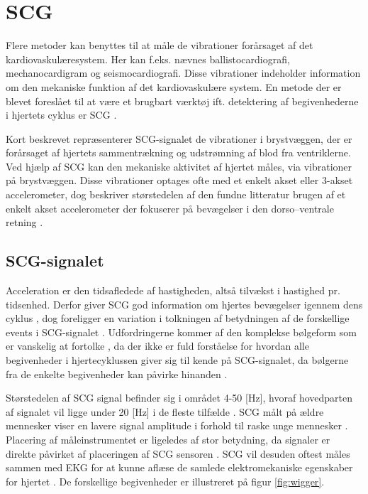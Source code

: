 \section{SCG}
Flere metoder kan benyttes til at måle de vibrationer forårsaget af det kardiovaskulæresystem. Her kan f.eks. nævnes ballistocardiografi, mechanocardigram og seismocardiografi. Disse vibrationer indeholder information om den mekaniske funktion af det kardiovaskulære system. En metode der er blevet foreslået til at være et brugbart værktøj ift. detektering af begivenhederne i hjertets cyklus er SCG \cite{phd}. 

Kort beskrevet repræsenterer SCG-signalet de vibrationer i brystvæggen, der er forårsaget af hjertets sammentrækning og udstrømning af blod fra ventriklerne. Ved hjælp af  SCG kan den mekaniske aktivitet af hjertet måles, via vibrationer på brystvæggen. Disse vibrationer optages ofte med et enkelt akset eller 3-akset accelerometer, dog beskriver størstedelen af den fundne litteratur  brugen af et enkelt akset accelerometer der fokuserer på bevægelser i den dorso–ventrale retning \cite{Recent_Advances}.

\subsection{SCG-signalet}
Acceleration er den tidsafledede af hastigheden, altså tilvækst i hastighed pr. tidsenhed. Derfor giver SCG god information om hjertes bevægelser igennem dens cyklus \cite{performance}, dog  foreligger en variation i tolkningen af betydningen af de forskellige events i SCG-signalet \cite{phd}. Udfordringerne kommer af den komplekse bølgeform som er vanskelig at fortolke \cite{zanetti}, da der ikke er fuld forståelse for hvordan alle begivenheder i hjertecyklussen giver sig til kende på SCG-signalet, da bølgerne fra de enkelte begivenheder kan påvirke hinanden \cite{abra}.

Størstedelen af SCG signal befinder sig i området 4-50 [Hz], hvoraf hovedparten af signalet vil ligge under 20 [Hz] i de fleste tilfælde \cite{phd}. 
SCG målt på ældre mennesker viser en lavere signal amplitude i forhold til raske unge mennesker \cite{Recent_Advances}. Placering af måleinstrumentet er ligeledes af stor betydning, da signaler er direkte påvirket af placeringen af SCG sensoren \cite{zanetti}. SCG vil desuden oftest måles sammen med EKG for at kunne aflæse de samlede elektromekaniske egenskaber for hjertet \cite{abra}. De forskellige begivenheder er illustreret på figur \ref{fig:wigger}.


